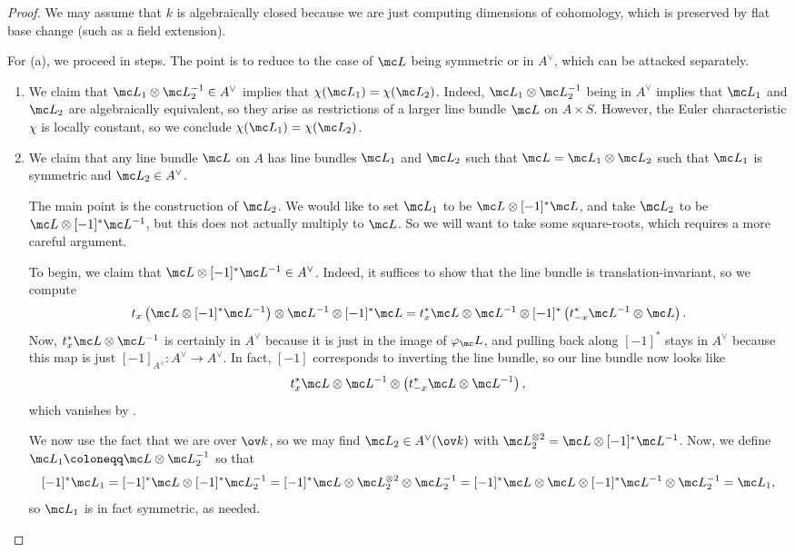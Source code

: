 \documentclass[../notes.tex]{subfiles}
\begin{document}
\begin{proof}
	We may assume that $k$ is algebraically closed because we are just computing dimensions of cohomology, which is preserved by flat base change (such as a field extension).

	For (a), we proceed in steps. The point is to reduce to the case of $\mc L$ being symmetric or in $A^\lor$, which can be attacked separately.
	\begin{enumerate}
		\item We claim that $\mc L_1\otimes\mc L_2^{-1}\in A^\lor$ implies that $\chi(\mc L_1)=\chi(\mc L_2)$. Indeed, $\mc L_1\otimes\mc L_2^{-1}$ being in $A^\lor$ implies that $\mc L_1$ and $\mc L_2$ are algebraically equivalent, so they arise as restrictions of a larger line bundle $\mc L$ on $A\times S$. However, the Euler characteristic $\chi$ is locally constant, so we conclude $\chi(\mc L_1)=\chi(\mc L_2)$.

		\item We claim that any line bundle $\mc L$ on $A$ has line bundles $\mc L_1$ and $\mc L_2$ such that $\mc L=\mc L_1\otimes\mc L_2$ such that $\mc L_1$ is symmetric and $\mc L_2\in A^\lor$.

		The main point is the construction of $\mc L_2$. We would like to set $\mc L_1$ to be $\mc L\otimes[-1]^*\mc L$, and take $\mc L_2$ to be $\mc L\otimes[-1]^*\mc L^{-1}$, but this does not actually multiply to $\mc L$. So we will want to take some square-roots, which requires a more careful argument.
		
		To begin, we claim that $\mc L\otimes[-1]^*\mc L^{-1}\in A^\lor$. Indeed, it suffices to show that the line bundle is trans\-lation-invariant, so we compute
		\[t_x\left(\mc L\otimes[-1]^*\mc L^{-1}\right)\otimes\mc L^{-1}\otimes[-1]^*\mc L=t_x^*\mc L\otimes\mc L^{-1}\otimes[-1]^*\left(t_{-x}^*\mc L^{-1}\otimes\mc L\right).\]
		Now, $t_x^*\mc L\otimes\mc L^{-1}$ is certainly in $A^\lor$ because it is just in the image of $\varphi_\mc L$, and pulling back along $[-1]^*$ stays in $A^\lor$ because this map is just $[-1]_{A^\lor}\colon A^\lor\to A^\lor$. In fact, $[-1]$ corresponds to inverting the line bundle, so our line bundle now looks like
		\[t_x^*\mc L\otimes\mc L^{-1}\otimes\left(t_{-x}^*\mc L\otimes\mc L^{-1}\right),\]
		which vanishes by .

		We now use the fact that we are over $\ov k$, so we may find $\mc L_2\in A^\lor(\ov k)$ with $\mc L_2^{\otimes2}=\mc L\otimes[-1]^*\mc L^{-1}$. Now, we define $\mc L_1\coloneqq\mc L\otimes\mc L_2^{-1}$ so that
		\[[-1]^*\mc L_1=[-1]^*\mc L\otimes[-1]^*\mc L_2^{-1}=[-1]^*\mc L\otimes\mc L_2^{\otimes2}\otimes\mc L_2^{-1}=[-1]^*\mc L\otimes\mc L\otimes[-1]^*\mc L^{-1}\otimes\mc L_2^{-1}=\mc L_1,\]
		so $\mc L_1$ is in fact symmetric, as needed.


\end{enumerate}
\end{proof}
\end{document}
